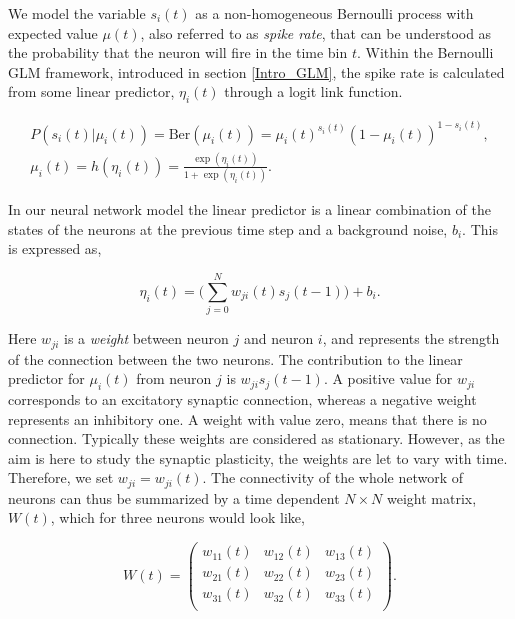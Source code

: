 We model the variable $s_i(t)$ as a non-homogeneous Bernoulli process with expected value $\mu (t)$, also referred to as \textit{spike rate}, that can be understood as the probability that the neuron will fire in the time bin $t$. Within the Bernoulli GLM framework, introduced in section \ref{Intro_GLM}, the spike rate is calculated from some linear predictor, $\eta_i(t)$ through a logit link function. 

\begin{equation}
\label{eq:prob}
\begin{split}
P(s_i(t)|\mu_i(t)) =  \text{Ber}(\mu_i(t)) = \mu_i(t)^{s_i(t)}(1-\mu_i(t))^{1-s_i(t)}, \\ \mu_i(t) = h(\eta_i(t))= \frac{\exp(\eta_i(t))}{1+\exp(\eta_i(t))}.
\end{split}
\end{equation}

In our neural network model the linear predictor is a linear combination of the states of the neurons at the previous time step and a background noise, $b_i$. This is expressed as,

\begin{equation}
\label{eq:lin_pred}
    \eta_i(t) = \Big (\sum_{j=0}^{N}  w_{ji}(t)s_j(t-1) \Big) + b_i.
\end{equation}

Here $w_{ji}$ is a \textit{weight} between neuron $j$ and neuron $i$, and represents the strength of the connection between the two neurons. The contribution to the linear predictor for $\mu_i(t)$ from neuron $j$ is $w_{ji}s_j(t-1)$. A positive value for $w_{ji}$ corresponds to an excitatory synaptic connection, whereas a negative weight represents an inhibitory one. A weight with value zero, means that there is no connection. Typically these weights are considered as stationary. However, as the aim is here to study the synaptic plasticity, the weights are let to vary with time. Therefore, we set $w_{ji} = w_{ji}(t)$. The connectivity of the whole network of neurons can thus be summarized by a time dependent $N \times N$ weight matrix, $W(t)$, which for three neurons would look like, 

\begin{equation*}
W(t) = 
\begin{pmatrix}
w_{11}(t) & w_{12}(t) & w_{13}(t)\\
w_{21}(t) & w_{22}(t) & w_{23}(t)\\
w_{31}(t) & w_{32}(t) & w_{33}(t)\\
\end{pmatrix}.
\end{equation*}

